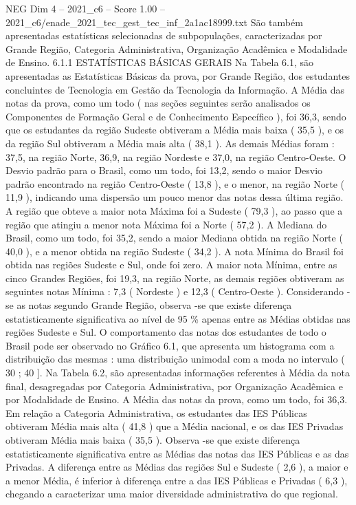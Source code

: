 \begin{textsample}{NEG Dim 4 – 2021\_c6 – Score 1.00 – 2021\_c6/enade\_2021\_tec\_gest\_tec\_inf\_2a1ac18999.txt}
São também apresentadas estatísticas selecionadas de subpopulações, caracterizadas por Grande Região, Categoria Administrativa, Organização Acadêmica e Modalidade de Ensino. 6.1.1 ESTATÍSTICAS BÁSICAS GERAIS Na Tabela 6.1, são apresentadas as Estatísticas Básicas da prova, por Grande Região, dos estudantes concluintes de Tecnologia em Gestão da Tecnologia da Informação.
A Média das notas da prova, como um todo ( nas seções seguintes serão analisados os Componentes de Formação Geral e de Conhecimento Específico ), foi 36,3, sendo que os estudantes da região Sudeste obtiveram a Média mais baixa ( 35,5 ), e os da região Sul obtiveram a Média mais alta ( 38,1 ).
As demais Médias foram : 37,5, na região Norte, 36,9, na região Nordeste e 37,0, na região Centro-Oeste.
O Desvio padrão para o Brasil, como um todo, foi 13,2, sendo o maior Desvio padrão encontrado na região Centro-Oeste ( 13,8 ), e o menor, na região Norte ( 11,9 ), indicando uma dispersão um pouco menor das notas dessa última região.
A região que obteve a maior nota Máxima foi a Sudeste ( 79,3 ), ao passo que a região que atingiu a menor nota Máxima foi a Norte ( 57,2 ).
A Mediana do Brasil, como um todo, foi 35,2, sendo a maior Mediana obtida na região Norte ( 40,0 ), e a menor obtida na região Sudeste ( 34,2 ).
A nota Mínima do Brasil foi obtida nas regiões Sudeste e Sul, onde foi zero.
A maior nota Mínima, entre as cinco Grandes Regiões, foi 19,3, na região Norte, as demais regiões obtiveram as seguintes notas Mínima : 7,3 ( Nordeste ) e 12,3 ( Centro-Oeste ).
Considerando -se as notas segundo Grande Região, observa -se que existe diferença estatisticamente significativa ao nível de 95 \% apenas entre as Médias obtidas nas regiões Sudeste e Sul.
O comportamento das notas dos estudantes de todo o Brasil pode ser observado no Gráfico 6.1, que apresenta um histograma com a distribuição das mesmas : uma distribuição unimodal com a moda no intervalo ( 30 ; 40 ].
Na Tabela 6.2, são apresentadas informações referentes à Média da nota final, desagregadas por Categoria Administrativa, por Organização Acadêmica e por Modalidade de Ensino.
A Média das notas da prova, como um todo, foi 36,3.
Em relação a Categoria Administrativa, os estudantes das IES Públicas obtiveram Média mais alta ( 41,8 ) que a Média nacional, e os das IES Privadas obtiveram Média mais baixa ( 35,5 ).
Observa -se que existe diferença estatisticamente significativa entre as Médias das notas das IES Públicas e as das Privadas.
A diferença entre as Médias das regiões Sul e Sudeste ( 2,6 ), a maior e a menor Média, é inferior à diferença entre a das IES Públicas e Privadas ( 6,3 ), chegando a caracterizar uma maior diversidade administrativa do que regional.

\end{textsample}
